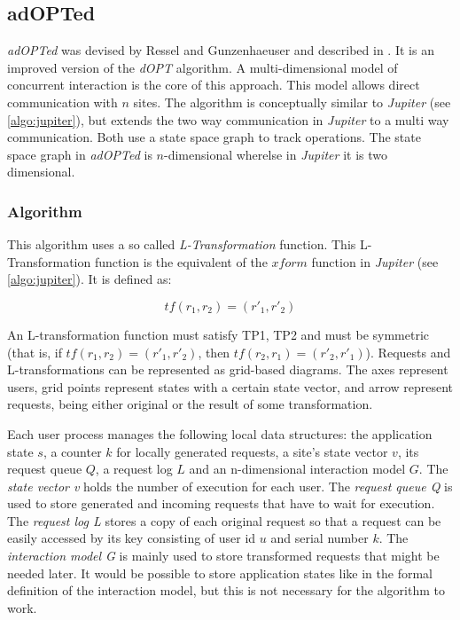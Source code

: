\subsection{adOPTed}
\label{algo:adopted}

\emph{adOPTed} was devised by Ressel and Gunzenhaeuser and described in \cite{ressel96}. It is an improved version of the \emph{dOPT} algorithm. A multi-dimensional model of concurrent interaction is the core of this approach. This model allows direct communication with $n$ sites. The algorithm is conceptually similar to \emph{Jupiter} (see \ref{algo:jupiter}), but extends the two way communication in \emph{Jupiter} to a multi way communication. Both use a state space graph to track operations. The state space graph in \emph{adOPTed} is $n$-dimensional wherelse in \emph{Jupiter} it is two dimensional.


\subsubsection{Algorithm}
This algorithm uses a so called \emph{L-Transformation} function. This L-Transformation function is the equivalent of the $xform$ function in \emph{Jupiter} (see \ref{algo:jupiter}). It is defined as:

\label{algo:adopted:tf}
$$ tf(r_1,r_2) = (r'_1,r'_2) $$

An L-transformation function must satisfy TP1, TP2 and must be symmetric (that is, if $tf(r_1,r_2) = (r'_1,r'_2)$, then $tf(r_2,r_1)=(r'_2,r'_1)$). Requests and L-transformations can be represented as grid-based diagrams. The axes represent users, grid points represent states with a certain state vector, and arrow represent requests, being either original or the result of some transformation.

Each user process manages the following local data structures: the application state $s$, a counter $k$ for locally generated requests, a site's state vector $v$, its request queue $Q$, a request log $L$ and an n-dimensional interaction model $G$. The \emph{state vector v} holds the number of execution for each user. The \emph{request queue Q} is used to store generated and incoming requests that have to wait for execution. The \emph{request log L} stores a copy of each original request so that a request can be easily accessed by its key consisting of user id $u$ and serial number $k$. The \emph{interaction model G} is mainly used to store transformed requests that might be needed later. It would be possible to store application states like in the formal definition of the interaction model, but this is not necessary for the algorithm to work.


